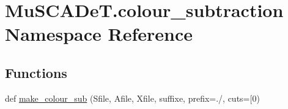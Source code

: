 \hypertarget{namespace_mu_s_c_a_de_t_1_1colour__subtraction}{}\section{Mu\+S\+C\+A\+De\+T.\+colour\+\_\+subtraction Namespace Reference}
\label{namespace_mu_s_c_a_de_t_1_1colour__subtraction}
\subsection*{Functions}
\begin{DoxyCompactItemize}
\item 
def \hyperlink{namespace_mu_s_c_a_de_t_1_1colour__subtraction_aaa57e5f31c93f38d46b0232a8b109451}{make\+\_\+colour\+\_\+sub} (Sfile, Afile, Xfile, suffixe, prefix=\textquotesingle{}./\textquotesingle{}, cuts=\mbox{[}\textquotesingle{}0\textquotesingle{})
\end{DoxyCompactItemize}

